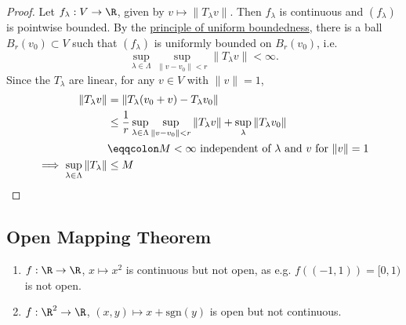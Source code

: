 \documentclass{article}
\begin{document}
\begin{proof}
    Let $f_\lambda: V \to \R$, given by $v \mapsto \|T_\lambda v\|$.
    Then $f_\lambda$ is continuous and $(f_\lambda)$ is pointwise bounded.
    By the \hyperlink{thm:pub}{principle of uniform boundedness}, there is a ball $B_r(v_0) \subset V$ such that $(f_\lambda)$ is uniformly bounded on $B_r(v_0)$, i.e.
    \begin{equation*}
        \sup_{\lambda \in \Lambda} \sup_{\|v - v_0\| < r} \|T_\lambda v\| < \infty.
    \end{equation*}
    Since the $T_\lambda$ are linear, for any $v \in V$ with $\|v\| = 1$,
    \begin{align*}
        \|T_\lambda v\| &= \|T_\lambda(v_0 + v) - T_\lambda v_0\| \\
                           &\leq \frac{1}{r} \sup_{\lambda \in \Lambda} \sup_{\|v - v_0\| < r} \|T_\lambda v\| + \sup_{\lambda} \|T_\lambda v_0\| \\
                           &\eqqcolon M < \infty
                           \text{ independent of $\lambda$ and $v$ for $\|v\| = 1$} \\
        \implies \sup_{\lambda \in \Lambda} \|T_\lambda\| &\leq M \qedhere
    \end{align*}
\end{proof}

\subsection{Open Mapping Theorem}

\begin{eg}
    \leavevmode
    \begin{enumerate}[label=(\roman*)]
        \item $f:\R \to \R$, $x \mapsto x^2$ is continuous but not open, as e.g. $f((-1, 1)) = [0, 1)$ is not open.
        \item $f:\R^2 \to \R$, $(x, y) \mapsto x + \mathrm{sgn}(y)$ is open but not continuous.
    \end{enumerate}
\end{eg}

\end{document}

